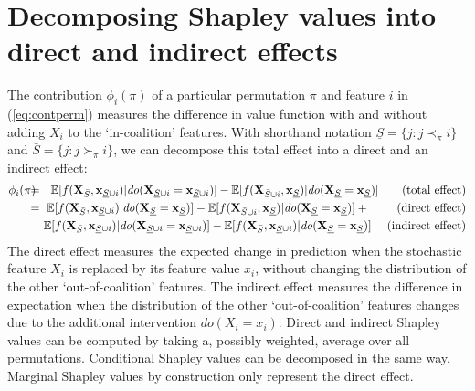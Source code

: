 \documentclass{article}
\newcommand{\vX}{\mathbf{X}}
\newcommand{\vx}{\mathbf{x}}
\newcommand{\expectation}{\mathbb{E}}
\newcommand{\contribution}{{\phi}}
\newcommand{\val}{{v}}
\newcommand{\dodo}{\mathit{do}}
\newcommand{\ldo}[1]{\dodo(X_{#1} = x_{#1})}
\newcommand{\lvdo}[1]{\dodo(\vX_{#1} = \vx_{#1})}
\newcommand{\perm}{\pi}
\newcommand{\isequal}{\hspace*{-2.5mm} & = & \hspace*{-2.5mm}}
\newcommand{\Spre}{\underline{S}}
\newcommand{\Spost}{\bar{S}}
\begin{document}
\section{Decomposing Shapley values into direct and indirect effects}

The contribution $\contribution_i(\perm)$ of a particular permutation $\perm$ and feature $i$ in (\ref{eq:contperm}) measures the difference in value function with and without adding $X_i$ to the `in-coalition' features.
With shorthand notation $\Spre = \{j: j \prec_\perm i\}$ and $\Spost = \{j: j \succ_\perm i\}$, we can decompose this total effect into a direct and an indirect effect:
\begin{eqnarray*}
	\contribution_i(\perm) \isequal
	\expectation[f(\vX_{\Spost},\vx_{\Spre \cup i})|\lvdo{\Spre \cup i}] - \expectation[f(\vX_{\Spost \cup i},\vx_{\Spre})|\lvdo{\Spre}] ~~~~~~\mbox{(total effect)} \\
	\isequal \expectation[f(\vX_{\Spost},\vx_{\Spre \cup i})|\lvdo{\Spre}] - \expectation[f(\vX_{\Spost \cup i},\vx_{\Spre})|\lvdo{\Spre}] + ~~~~~~~\mbox{(direct effect)} \\
	&& \! \! \! \! \expectation[f(\vX_{\Spost},\vx_{\Spre \cup i})|\lvdo{\Spre \cup i}] - \expectation[f(\vX_{\Spost},\vx_{\Spre \cup i})|\lvdo{\Spre}] ~~~~\mbox{(indirect effect)}
\end{eqnarray*}
The direct effect measures the expected change in prediction when the stochastic feature $X_i$ is replaced by its feature value $x_i$, without changing the distribution of the other `out-of-coalition' features. The indirect effect measures the difference in expectation when the distribution of the other `out-of-coalition' features changes due to the additional intervention $\ldo{i}$. Direct and indirect Shapley values can be computed by taking a, possibly weighted, average over all permutations. Conditional Shapley values can be decomposed in the same way. Marginal Shapley values by construction only represent the direct effect.

\newcommand{\patd}{{\em D}}
\newcommand{\pata}{{\em A}}
\newcommand{\pats}{{\em S}}
\end{document}
